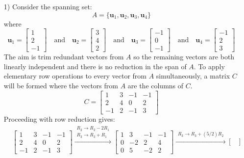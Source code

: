 \documentclass{article}
\begin{document}
\begin{itemize}   
\item[1)] Consider the spanning set:
\[A = \{\mathbf{u}_1, \mathbf{u}_2, \mathbf{u}_3, \mathbf{u}_4\}\]
where
\[\mathbf{u}_1 = \begin{bmatrix}
1 \\ 2 \\ -1  
\end{bmatrix} \quad\text{and}\quad \mathbf{u}_2 =\begin{bmatrix} 
3 \\ 4 \\ 2 
\end{bmatrix} \quad\text{and}\quad \mathbf{u}_3 = \begin{bmatrix} 
-1 \\ 0 \\ -1 
\end{bmatrix} \quad\text{and}\quad \mathbf{u}_4 = \begin{bmatrix}
-1 \\ 2 \\ 3 
\end{bmatrix}\] 
The aim is trim redundant vectors from \(A\) so the remaining vectors are both linearly independent and there is no reduction in the span of \(A\). To apply elementary row operations to every vector from \(A\) simultaneously, a matrix \(C\) will be formed where the vectors from \(A\) are the columns of \(C\).
\[C = \begin{bmatrix}
  1 & 3 &  -1 &  -1 \\
  2 & 4 &   0 &   2 \\
-1 &  2 & -1 &   3 
\end{bmatrix}\]
Proceeding with row reduction gives:
\begin{align*}
& \begin{bmatrix}
  1 & 3 &  -1 &  -1 \\
  2 & 4 &   0 &   2 \\
-1 &  2 & -1 &   3 
\end{bmatrix} \xrightarrow{\begin{array}{c} R_2 \rightarrow R_2 - 2R_1 \\ R_3 \rightarrow R_3 + R_1 \end{array}} \begin{bmatrix}
1 &  3 & -1 &  -1 \\
0 & -2 &  2 &   4 \\
0 &  5 & -2 &   2 
\end{bmatrix} \xrightarrow{\begin{array}{c} R_3 \rightarrow R_3 + (5/2)R_2 \end{array}} \begin{bmatrix}

\end{bmatrix}
\end{align*}
\end{itemize}
\end{document}
